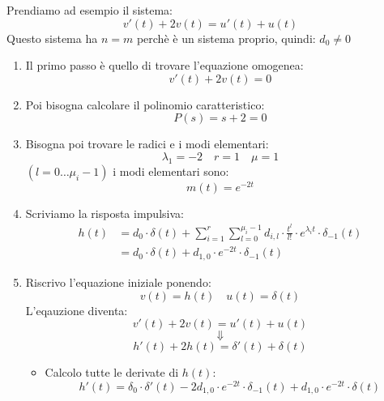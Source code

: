 \documentclass[a4paper]{article}
\begin{document}
\begin{example}
  Prendiamo ad esempio il sistema:
  \[
  v'(t) + 2v(t) = u'(t) + u(t)
  \] 
  Questo sistema ha \( n=m \) perchè è un sistema proprio, quindi: \( d_0 \neq 0 \) 
  \begin{enumerate}
    \item Il primo passo è quello di trovare l'equazione omogenea:
      \[
      v'(t) + 2v(t) = 0
      \] 

    \item Poi bisogna calcolare il polinomio caratteristico:
      \[
      P(s) = s + 2 = 0
      \] 

    \item Bisogna poi trovare le radici e i modi elementari:
      \[
      \lambda_1 = -2 \quad r = 1 \quad \mu = 1
      \] 
      \( \left( l = 0 \ldots \mu_i -1 \right)  \) 
      i modi elementari sono:
      \[
        m(t) = e^{-2t}
      \] 

    \item Scriviamo la risposta impulsiva:
      \[
        \begin{aligned}
          h(t) &= d_0 \cdot \delta(t) + \sum_{i=1}^{r} \sum_{l=0}^{\mu_i - 1} d_{i,l} \cdot
          \frac{t^l}{l!} \cdot e^{\lambda_i t} \cdot \delta_{-1}(t)\\
               &= d_0 \cdot \delta(t) + d_{1,0} \cdot e^{-2t} \cdot \delta_{-1}(t)
        \end{aligned}
      \] 

    \item Riscrivo l'equazione iniziale ponendo:
      \[
      v(t) = h(t) \quad u(t) = \delta(t)
      \] 
      L'eqauzione diventa:
      \[
      v'(t) + 2v(t) = u'(t) + u(t)
      \] 
      \[
      \Downarrow
      \] 
      \[
      h'(t) + 2h(t) = \delta'(t) + \delta(t)
      \] 
      \begin{itemize}
        \item Calcolo tutte le derivate di \( h(t) \):
          \[
            h'(t) = \delta_0 \cdot \delta'(t) - 2d_{1,0} \cdot e^{-2t} \cdot \delta_{-1}(t)
            + d_{1,0} \cdot e^{-2t} \cdot \delta(t)
          \] 
      \end{itemize}


\end{enumerate}
\end{example}
\end{document}
